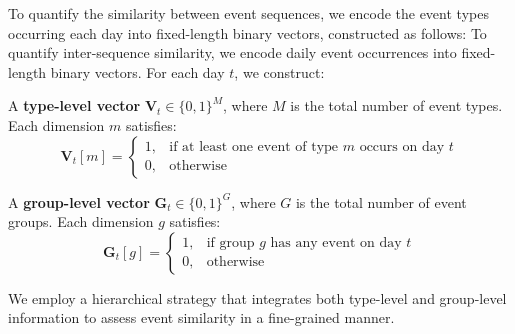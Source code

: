 \documentclass[sigconf, nonacm]{acmart} %
\begin{document}

To quantify the similarity between event sequences, we encode the event types occurring each day into fixed-length binary vectors, constructed as follows: 
To quantify inter-sequence similarity, we encode daily event occurrences into fixed-length binary vectors. For each day $t$, we construct:

    A \textbf{type-level vector} $\mathbf{V}_t \in \{0,1\}^M$, where $M$ is the total number of event types. Each dimension $m$ satisfies:
    \begin{equation}
        \mathbf{V}_t[m] = 
        \begin{cases} 
        1, & \text{if at least one event of type $m$ occurs on day $t$} \\
        0, & \text{otherwise}
        \end{cases}
    \end{equation}
    
    A \textbf{group-level vector} $\mathbf{G}_t \in \{0,1\}^G$, where $G$ is the total number of event groups. Each dimension $g$ satisfies:
    \begin{equation}
        \mathbf{G}_t[g] = 
        \begin{cases} 
        1, & \text{if group $g$ has any event on day $t$} \\
        0, & \text{otherwise}
        \end{cases}
    \end{equation}



We employ a hierarchical strategy that integrates both type-level and group-level information to assess event similarity in a fine-grained manner.
\end{document}
